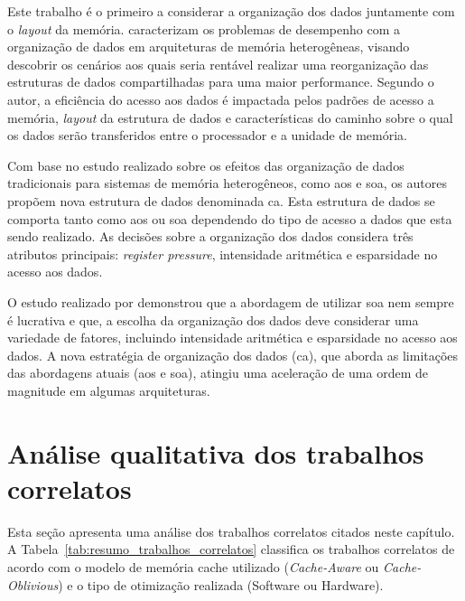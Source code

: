 Este trabalho é o primeiro a considerar a organização dos dados juntamente com o \textit{layout} da memória.
 caracterizam os problemas de desempenho com a organização de dados em arquiteturas de memória heterogêneas, visando descobrir os cenários aos quais seria rentável realizar uma reorganização das estruturas de dados compartilhadas para uma maior performance.
Segundo o autor, a eficiência do acesso aos dados é impactada pelos padrões de acesso a memória, \textit{layout} da estrutura de dados e características do caminho sobre o qual os dados serão transferidos entre o processador e a unidade de memória.

Com base no estudo realizado sobre os efeitos das organização de dados tradicionais para sistemas de memória heterogêneos, como \ac{aos} e \ac{soa}, os autores propõem nova estrutura de dados denominada \ac{ca}.
Esta estrutura de dados se comporta tanto como \ac{aos} ou \ac{soa} dependendo do tipo de acesso a dados que esta sendo realizado.
As decisões sobre a organização dos dados considera três atributos principais: \textit{register pressure}, intensidade aritmética e esparsidade no acesso aos dados.

O estudo realizado por  demonstrou que a abordagem de utilizar \ac{soa} nem sempre é lucrativa e que, a escolha da organização dos dados deve considerar uma variedade de fatores, incluindo intensidade aritmética e esparsidade no acesso aos dados.
A nova estratégia de organização dos dados (\ac{ca}), que aborda as limitações das abordagens atuais (\ac{aos} e \ac{soa}), atingiu uma aceleração de uma ordem de magnitude em algumas arquiteturas.

\section{Análise qualitativa dos trabalhos correlatos}
\label{sec:analise_trabalhos_correlatos}

Esta seção apresenta uma análise dos trabalhos correlatos citados neste capítulo.
A Tabela~\ref{tab:resumo_trabalhos_correlatos} classifica os trabalhos correlatos de acordo com o modelo de memória cache utilizado (\textit{Cache-Aware} ou \textit{Cache-Oblivious}) e o tipo de otimização realizada (Software ou Hardware).


